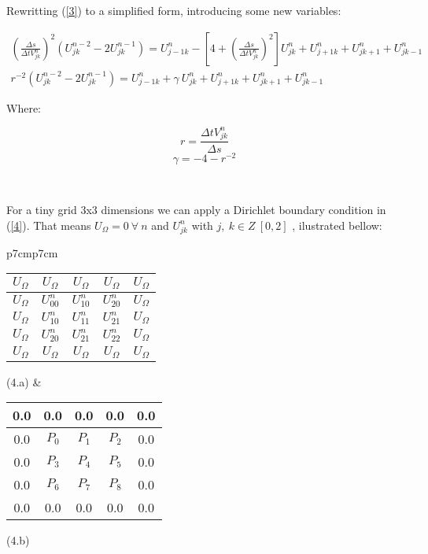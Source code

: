 \documentclass[legalpaper, 12pt]{article}
\begin{document}
\newpage

Rewritting (\ref{3}) to a simplified form, introducing some new variables: 

\begin{multline}
\left( \frac{\Delta s}{ \Delta t  V_{jk}^n} \right) ^2 \left( U_{jk}^{n-2} -2 U_{jk}^{n-1} \right) =
  U_{j-1k}^n - \left[ 4+ \left( \frac{\Delta s}{\Delta t  V_{jk}^n} \right) ^2  \right] U_{jk}^n + U_{j+1k}^n + U_{jk+1}^n + U_{jk-1}^n  \\
r^{-2} \left( U_{jk}^{n-2} -2 U_{jk}^{n-1} \right) =
  U_{j-1k}^n + \gamma \  U_{jk}^n + U_{j+1k}^n + U_{jk+1}^n + U_{jk-1}^n 
\label{4}
\end{multline}

Where: 

$$ r = \frac{\Delta t  V_{jk}^n}{ \Delta s} $$
$$ \gamma = -4 -r^{-2}  $$

\

For a tiny grid 3x3 dimensions we can apply a Dirichlet boundary condition in (\ref{4}). That means $ U_{\Omega} = 0 \ \forall \ n $ and $ U_{jk}^n $ with $ j, \ k \in Z \ \left[ 0, 2  \right] $ , ilustrated bellow: \\ 
\newline

\begin{tabular}{p{7cm}p{7cm}}
{ \begin{tabular}{| c | c | c | c | c |}
	\hline
	$U_{\Omega}$ & $U_{\Omega}$ & $U_{\Omega}$ & $U_{\Omega}$ & $U_{\Omega}$ \\ \hline
	$U_{\Omega}$ & { \color{red} $U_{00}^n$}& { \color{red} $U_{10}^n$ } & { \color{red} $U_{20}^n$ } & $U_{\Omega}$ \\ \hline
	$U_{\Omega}$ & { \color{red} $U_{10}^n$ } & { \color{red} $U_{11}^n$ } & { \color{red} $U_{21}^n$ } & $U_{\Omega}$\\ \hline
	$U_{\Omega}$ & { \color{red} $U_{20}^n$ } & { \color{red} $U_{21}^n$ } & { \color{red} $U_{22}^n$ } & $U_{\Omega}$\\ \hline
	$U_{\Omega}$ & $U_{\Omega}$ & $U_{\Omega}$ & $U_{\Omega}$ & $U_{\Omega}$ \\ \hline
\end{tabular} }
(4.a)
&
{ \begin{tabular}{| c | c | c | c | c |}
	\hline
	0.0 & 0.0 & 0.0 & 0.0 & 0.0 \\ \hline
	0.0 & { \color{red} $P_{0}$ } & { \color{red} $P_{1}$ } & { \color{red} $P_{2}$ } & 0.0 \\ \hline
	0.0 & { \color{red} $P_{3}$ } & { \color{red} $P_{4}$ } & { \color{red} $P_{5}$ } & 0.0 \\ \hline
	0.0 & { \color{red} $P_{6}$ } & { \color{red} $P_{7}$ } & { \color{red} $P_{8}$ } & 0.0 \\ \hline
	0.0 & 0.0 & 0.0 & 0.0 & 0.0 \\ \hline
\end{tabular} }
(4.b)
\end{tabular}
\end{document}
